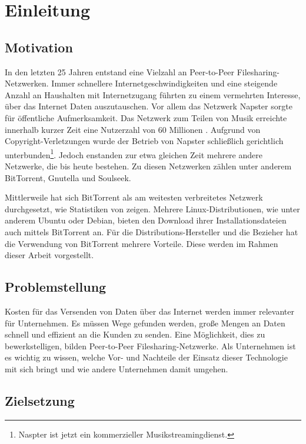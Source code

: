 \chapter{Einleitung}
\label{cha:Einleitung}

\section{Motivation}

In den letzten 25 Jahren entstand eine Vielzahl an Peer-to-Peer Filesharing-Netz\-werken. Immer schnellere Internetgeschwindigkeiten und eine steigende Anzahl an Haushalten mit Internetzugang führten zu einem vermehrten Interesse, über das Internet Daten auszutauschen. Vor allem das Netzwerk Napster sorgte für öffentliche Aufmerksamkeit. Das Netzwerk zum Teilen von Musik erreichte innerhalb kurzer Zeit eine Nutzerzahl von 60 Millionen \parencite{poblocki2001napster}. Aufgrund von Copyright-Verletzungen wurde der Betrieb von Napster schließlich gerichtlich unterbunden\footnote[1]{Naspter ist jetzt ein kommerzieller Musikstreamingdienst.}. Jedoch enstanden zur etwa gleichen Zeit mehrere andere Netzwerke, die bis heute bestehen. Zu diesen Netzwerken zählen unter anderem BitTorrent, Gnutella und Soulseek. 

Mittlerweile hat sich BitTorrent als am weitesten verbreitetes Netzwerk durchgesetzt, wie Statistiken von \textcite{BitTorrentTrafficSandvine} zeigen. 
Mehrere Linux-Distributionen, wie unter anderem Ubuntu oder Debian, bieten den Download ihrer Installationsdateien auch mittels BitTorrent an. Für die Distributions-Hersteller und die Bezieher hat die Verwendung von BitTorrent mehrere Vorteile. Diese werden im Rahmen dieser Arbeit vorgestellt.


\section{Problemstellung}

Kosten für das Versenden von Daten über das Internet werden immer relevanter für Unternehmen. Es müssen Wege gefunden werden, große Mengen an Daten schnell und effizient an die Kunden zu senden. Eine Möglichkeit, dies zu bewerkstelligen, bilden Peer-to-Peer Filesharing-Netzwerke. Als Unternehmen ist es wichtig zu wissen, welche Vor- und Nachteile der Einsatz dieser Technologie mit sich bringt und wie andere Unternehmen damit umgehen.

\section{Zielsetzung}

